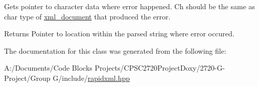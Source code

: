 Gets pointer to character data where error happened. Ch should be the same as char type of \mbox{\hyperlink{classrapidxml_1_1xml__document}{xml\+\_\+document}} that produced the error. \begin{DoxyReturn}{Returns}
Pointer to location within the parsed string where error occured. 
\end{DoxyReturn}


The documentation for this class was generated from the following file\+:\begin{DoxyCompactItemize}
\item 
A\+:/\+Documents/\+Code Blocks Projects/\+C\+P\+S\+C2720\+Project\+Doxy/2720-\/\+G-\/\+Project/\+Group G/include/\mbox{\hyperlink{include_2rapidxml_8hpp}{rapidxml.\+hpp}}\end{DoxyCompactItemize}
